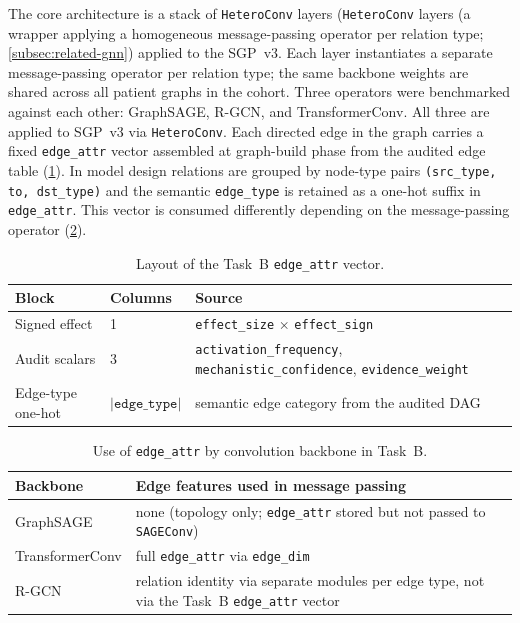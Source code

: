 The core architecture is a stack of \texttt{HeteroConv} layers (\texttt{HeteroConv} layers (a wrapper applying a homogeneous message-passing operator per 
relation type; \cref{subsec:related-gnn}) 
applied to the
SGP~v3. 
Each layer instantiates a separate message-passing operator per relation type; 
the same backbone weights are shared across all patient graphs
in the cohort. Three operators 
were benchmarked against each other: GraphSAGE, R-GCN, and
TransformerConv.
All three are applied to SGP~v3 via \texttt{HeteroConv}.
Each directed edge in the graph carries a fixed \texttt{edge\_attr} vector 
assembled at
graph-build phase from the audited edge table (\cref{tab:edge_attr_layout}).
In model design relations are grouped by node-type pairs \texttt{(src\_type, to, dst\_type)}
and the semantic \texttt{edge\_type} is
retained as a one-hot suffix in \texttt{edge\_attr}. 
This vector is consumed differently depending on the message-passing
operator (\cref{tab:edge_attr_by_conv}).

\begin{table}[H]
  \centering
  \small
  \caption{Layout of the Task~B \texttt{edge\_attr} vector.}
  \label{tab:edge_attr_layout}
  \begin{tabularx}{\textwidth}{@{}l l X@{}}
    \toprule
    \textbf{Block} & \textbf{Columns} & \textbf{Source} \\
    \midrule
    Signed effect &
    1 &
    \texttt{effect\_size} $\times$ \texttt{effect\_sign} \\
    Audit scalars &
    3 &
    \texttt{activation\_frequency}, \texttt{mechanistic\_confidence},
    \texttt{evidence\_weight} \\
    Edge-type one-hot &
    $|\texttt{edge\_type}|$ &
    semantic edge category from the audited DAG \\
    \bottomrule
  \end{tabularx}
\end{table}

\begin{table}[H]
  \centering
  \small
  \caption{Use of \texttt{edge\_attr} by convolution backbone in Task~B.}
  \label{tab:edge_attr_by_conv}
  \begin{tabularx}{\textwidth}{@{}l X@{}}
    \toprule
    \textbf{Backbone} & \textbf{Edge features used in message passing} \\
    \midrule
    GraphSAGE &
    none (topology only; \texttt{edge\_attr} stored but not passed to
    \texttt{SAGEConv}) \\
    TransformerConv &
    full \texttt{edge\_attr} via \texttt{edge\_dim} \\
    R-GCN &
    relation identity via separate modules per edge type, not via the
    Task~B \texttt{edge\_attr} vector \\
    \bottomrule
  \end{tabularx}
\end{table}


